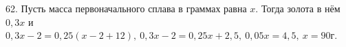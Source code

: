 62. Пусть масса первоначального сплава в граммах равна $x.$ Тогда золота в нём $0,3x$ и $0,3x-2=0,25(x-2+12),\ 0,3x-2=0,25x+2,5,\ 0,05x=4,5,\ x=90$г.\\
